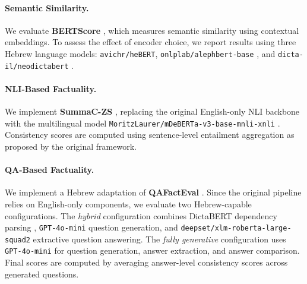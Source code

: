 \documentclass[11pt]{article}
\begin{document}
\paragraph{Semantic Similarity.}
We evaluate \textbf{BERTScore} \cite{zhang2020bertscore}, which measures semantic similarity using contextual embeddings. To assess the effect of encoder choice, we report results using three Hebrew language models: \texttt{avichr/heBERT}, \texttt{onlplab/alephbert-base} \citep{seker-etal-2022-alephbert}, and \texttt{dicta-il/neodictabert} \citep{shmidman2023dictabert}.

\paragraph{NLI-Based Factuality.}
We implement \textbf{SummaC-ZS} \cite{DBLP:journals/corr/abs-2111-09525}, replacing the original English-only NLI backbone with the multilingual model \texttt{MoritzLaurer/mDeBERTa-v3-base-mnli-xnli} \cite{laurer-etal-2022-deberta}. Consistency scores are computed using sentence-level entailment aggregation as proposed by the original framework.

\paragraph{QA-Based Factuality.}
We implement a Hebrew adaptation of \textbf{QAFactEval} \cite{fabbri-etal-2022-qafacteval}. Since the original pipeline relies on English-only components, we evaluate two Hebrew-capable configurations. The \emph{hybrid} configuration combines DictaBERT dependency parsing \cite{shmidman2023dictabert}, \texttt{GPT-4o-mini} question generation, and \texttt{deepset/xlm-roberta-large-squad2} extractive question answering. The \emph{fully generative} configuration uses \texttt{GPT-4o-mini} for question generation, answer extraction, and answer comparison. Final scores are computed by averaging answer-level consistency scores across generated questions.
\end{document}
